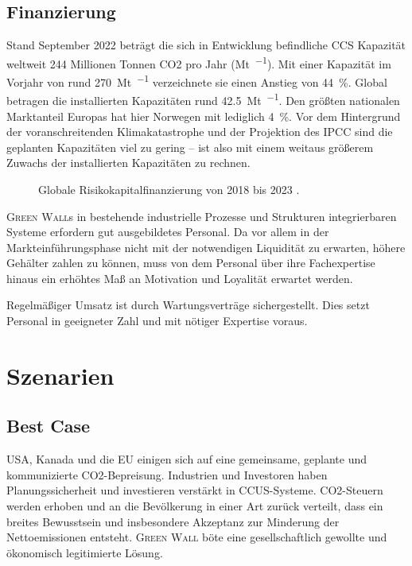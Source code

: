 \subsection{Finanzierung}

Stand September 2022 beträgt die sich in Entwicklung befindliche CCS Kapazität weltweit \num{244} Millionen Tonnen CO2 pro Jahr (\unit{\mega\tonne\per\an}).
Mit einer Kapazität im Vorjahr von rund \qty{270}{\mega\tonne\per\an} verzeichnete sie einen Anstieg von \qty{44}{\percent}.
Global betragen die installierten Kapazitäten rund \qty{42.5}{\mega\tonne\per\an}.
Den größten nationalen Marktanteil Europas hat hier Norwegen mit lediglich \qty{4}{\percent}.
Vor dem Hintergrund der voranschreitenden Klimakatastrophe und der Projektion des IPCC sind die geplanten Kapazitäten viel zu gering -- ist also mit einem weitaus größerem Zuwachs der installierten Kapazitäten zu rechnen\cite{Book.EJR.CARBONCAPTUREUTILISATIONANDSTORAGEINTHEEUROPEANUNION.2023}.\par\medskip
%
\begin{figure}[h]
    \centering
    
    \caption[Globale Risikokapitalfinanzierung von 2018 bis 2023]{Globale Risikokapitalfinanzierung von 2018 bis 2023 \cite{Statista2022.GlobalVentureCapital}.}\label{fig:glob ccus vc inv}
\end{figure}

\textsc{Green Wall}s in bestehende industrielle Prozesse und Strukturen integrierbaren Systeme erfordern gut ausgebildetes Personal.
Da vor allem in der Markteinführungsphase nicht mit der notwendigen Liquidität zu erwarten, höhere Gehälter zahlen zu können, muss von dem Personal über ihre Fachexpertise hinaus ein erhöhtes Maß an Motivation und Loyalität erwartet werden.\par\medskip

Regelmäßiger Umsatz ist durch Wartungsverträge sichergestellt.
Dies setzt Personal in geeigneter Zahl und mit nötiger Expertise voraus.

\section{Szenarien}

\subsection{Best Case}

USA, Kanada und die EU einigen sich auf eine gemeinsame, geplante und kommunizierte CO2-Bepreisung.
Industrien und Investoren haben Planungssicherheit und investieren verstärkt in CCUS-Systeme.
CO2-Steuern werden erhoben und an die Bevölkerung in einer Art zurück verteilt, dass ein breites Bewusstsein und insbesondere Akzeptanz zur Minderung der Nettoemissionen entsteht.
\textsc{Green Wall} böte eine gesellschaftlich gewollte und ökonomisch legitimierte Lösung.

